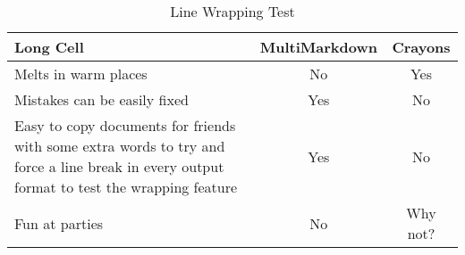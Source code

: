 \begin{table}[htbp]
\begin{minipage}{\linewidth}
\setlength{\tymax}{0.5\linewidth}
\centering
\small
\caption{Line Wrapping Test}
\label{linewrappingtest}
\begin{tabulary}{\textwidth}{@{}LCC@{}} \toprule
Long Cell&MultiMarkdown&Crayons\\
\midrule
Melts in warm places&No&Yes\\
Mistakes can be easily fixed&Yes&No\\
Easy to copy documents for friends with some extra words to try and force a line break in every output format to test the wrapping feature&Yes&No\\
Fun at parties&No&Why not?\\

\bottomrule

\end{tabulary}
\end{minipage}
\end{table}





